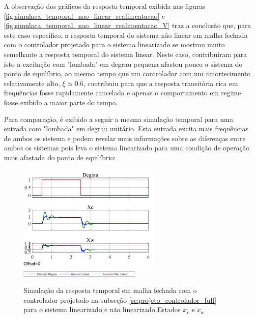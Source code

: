 \documentclass[a4paper]{ifacconf}
\begin{document}
    A observação dos gráficos da resposta temporal exibida nas figuras \ref{fig:simulaca_temporal_nao_linear_realimentacao} e \ref{fig:simulaca_temporal_nao_linear_realimentacao_V} traz a conclusão que, para este caso específico, a resposta temporal do sistema não linear em malha fechada com o controlador projetado para o sistema linearizado se mostrou muito semelhante a resposta temporal do sistema linear. Neste caso, contribuíram para isto a excitação com "lombada" em degrau pequena afastou pouco o sistema do ponto de equilíbrio, ao mesmo tempo que um controlador com um amortecimento relativamente alto, $\xi \simeq 0.6$, contribuiu para que a resposta transitória rica em frequências fosse rapidamente cancelada e apenas o comportamento em regime fosse exibido a maior parte do tempo.
    
    Para comparação, é exibido a seguir a mesma simulação temporal para uma entrada com "lombada" em degrau unitário. Esta entrada excita mais frequências de ambos os sistema e podem revelar mais informações sobre as diferenças entre ambos os sistemas pois leva o sistema linearizado para uma condição de operação mais afastada do ponto de equilíbrio: 
    
    \FloatBarrier
    \begin{figure}[htbp]
        \begin{centering}
            \includegraphics[width=7cm]{img/simulaca_temporal_nao_linear_realimentacao_unit.png}
            \includegraphics[width=6cm]{img/sim_nao_linear_simulink_temp_leg.png}
            \caption{Simulação da resposta temporal em malha fechada com o controlador projetado na subseção \ref{sc:projeto_controlador_full} para o sistema linearizado e não linearizado.Estados $x_c$ e $x_w$ }
            \label{fig:simulaca_temporal_nao_linear_realimentacao_unit}
        \end{centering}
    \end{figure}
    \FloatBarrier
	
\end{document}
